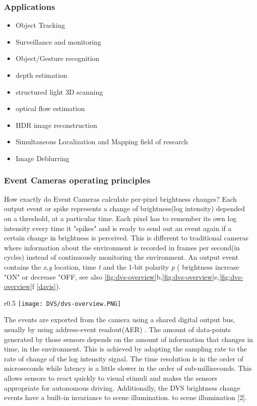 \documentclass[12pt]{report}
\begin{document}
\subsubsection{Applications}

\begin{itemize}
    \item Object Tracking
    \item Surveillance and monitoring
    \item Object/Gesture recognition
    \item depth estimation
    \item structured light 3D scanning
    \item optical flow estimation 
    \item HDR image reconstruction
    \item Simultaneous Localization and Mapping field of research
    \item Image Deblurring
\end{itemize}
\subsubsection{Event Cameras operating principles}
How exactly do Event Cameras calculate per-pixel brightness changes? Each output event or spike represents a change of brightness(log intensity) depended on a threshold, at a particular time. Each pixel has to remember its own log intensity every time it "spikes" and is ready to send out an event again if a certain change in brightness is perceived. This is different to traditional cameras where information about the environment is recorded in frames per second(in cycles) instead of continuously monitoring the environment. An output event contains the \textit{x,y}  location, time \textit{t} and the 1-bit polarity \textit{p} ( brightness increase "ON" or decrease "OFF, see also \ref{fig:dvs-overview}b,\ref{fig:dvs-overview}e,\ref{fig:dvs-overview}f \ref{davis}).

\begin{wrapfigure}{r}{0.5\textwidth} %
    \centering
     \texttt{[image: DVS/dvs-overview.PNG]}
    \caption{DAVIS camera}
    \label{fig:dvs-overview}
\end{wrapfigure}

The events are exported from the camera using a shared digital output bus, usually by using address-event readout(AER) \cite{boahen2004} \cite{liu2015} . The amount of data-points generated by those sensors depends on the amount of information that changes in time, in the environment. This is achieved by adapting the sampling rate to the rate of change of the log intensity signal. The time resolution is in the order of microseconds while latency is a little slower in the order of sub-milliseconds. This allows sensors to react quickly to visual stimuli and makes the sensors appropriate for autonomous driving. Additionally, the DVS brightness change events have a built-in invariance to scene illumination.
to scene illumination [2].
\end{document}
